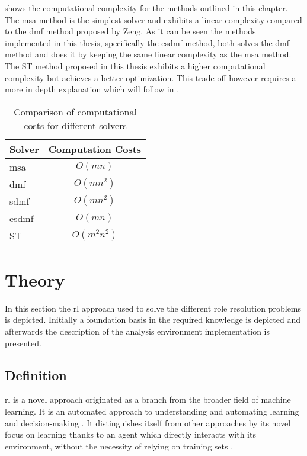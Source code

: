 \documentclass{seal_thesis}
\begin{document}
 shows the computational complexity for the methods outlined in this chapter. The \gls{msa} method is the simplest solver and exhibits a linear complexity compared to the \gls{dmf} method proposed by Zeng. As it can be seen the methods implemented in this thesis, specifically the \gls{esdmf} method, both solves the \gls{dmf} method and does it by keeping the same linear complexity as the \gls{msa} method. The ST method proposed in this thesis exhibits a higher computational complexity but achieves a better optimization. This trade-off however requires a more in depth explanation which will follow in .

\begin{table}[!ht]
\centering
\begin{tabular}{@{}lc@{}}
\toprule
Solver & Computation Costs \\ \midrule
\gls{msa}    & $O(mn)$           \\
\gls{dmf}   & $O(mn^2)$         \\
\gls{sdmf}  & $O(mn^2)$         \\
\gls{esdmf}  & $O(mn)$           \\
ST 	   & $O(m^2n^2)$ \\	\bottomrule
\end{tabular}
\caption{Comparison of computational costs for different solvers}
\label{tab:big_oh_solvers}
\end{table}

\section{ Theory}

In this section the \gls{rl} approach used to solve the different role resolution problems is depicted. Initially a foundation basis in the required knowledge is depicted and afterwards the description of the analysis environment implementation is presented.

\subsection{ Definition}

\gls{rl} is a novel approach originated as a branch from the broader field of machine learning. It is an automated approach to understanding and automating learning and decision-making \cite[p. 15]{Sutton2017}. It distinguishes itself from other approaches by its novel focus on learning thanks to an agent which directly interacts with its environment, without the necessity of relying on training sets \cite[p. 15]{Sutton2017}.
\end{document}
